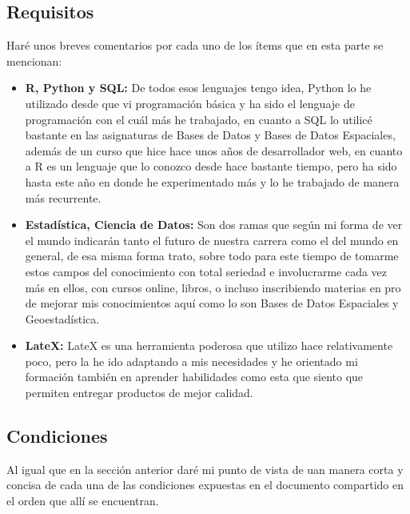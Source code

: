 \documentclass[12pt]{article}
\begin{document}
\subsection{Requisitos}
Haré unos breves comentarios por cada uno de los ítems que en esta parte se mencionan:
\begin{itemize}
    \item \textbf{R, Python y SQL: }De todos esos lenguajes tengo idea, Python lo he utilizado desde que vi programación básica y ha sido el lenguaje de programación con el cuál más he trabajado, en cuanto a SQL lo utilicé bastante en las asignaturas de Bases de Datos y Bases de Datos Espaciales, además de un curso que hice hace unos años de desarrollador web, en cuanto a R es un lenguaje que lo conozco desde hace bastante tiempo, pero ha sido hasta este año en donde he experimentado más y lo he trabajado de manera más recurrente.
    \item \textbf{Estadística, Ciencia de Datos: }Son dos ramas que según mi forma de ver el mundo indicarán tanto el futuro de nuestra carrera como el del mundo en general, de esa misma forma trato, sobre todo para este tiempo de tomarme estos campos del conocimiento con total seriedad e involucrarme cada vez más en ellos, con cursos online, libros, o incluso inscribiendo materias en pro de mejorar mis conocimientos aquí como lo son Bases de Datos Espaciales y Geoestadística.
    \item \textbf{LateX: }LateX es una herramienta poderosa que utilizo hace relativamente poco, pero la he ido adaptando a mis necesidades y he orientado mi formación también en aprender habilidades como esta que siento que permiten entregar productos de mejor calidad.    
\end{itemize}

\subsection{Condiciones}
Al igual que en la sección anterior daré mi punto de vista de uan manera corta y concisa de cada una de las condiciones expuestas en el documento compartido en el orden que allí se encuentran.
\end{document}
